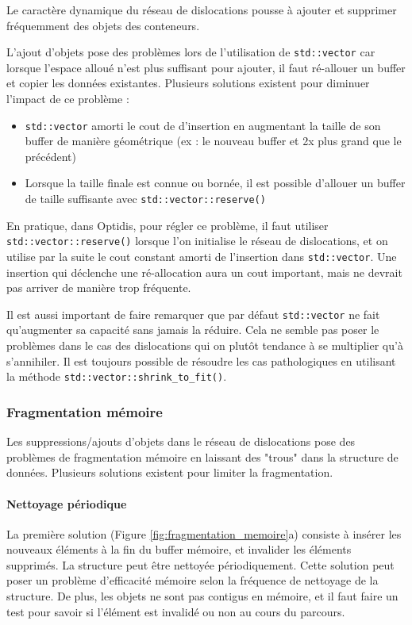 Le caractère dynamique du réseau de dislocations pousse à ajouter et supprimer fréquemment des objets des conteneurs. 

L'ajout d'objets pose des problèmes lors de l'utilisation de \verb|std::vector| car lorsque l'espace alloué n'est plus suffisant pour ajouter, il faut ré-allouer un buffer et copier les données existantes. Plusieurs solutions existent pour diminuer l'impact de ce problème :
\begin{itemize}
	\item \verb|std::vector| amorti le cout de d'insertion en augmentant la taille de son buffer de manière géométrique (ex : le nouveau buffer et 2x plus grand que le précédent)
	\item Lorsque la taille finale est connue ou bornée, il est possible d'allouer un buffer de taille suffisante avec \verb|std::vector::reserve()|
\end{itemize}
En pratique, dans Optidis, pour régler ce problème, il faut utiliser \verb|std::vector::reserve()| lorsque l'on initialise le réseau de dislocations, et on utilise par la suite le cout constant amorti de l'insertion dans \verb|std::vector|. Une insertion qui déclenche une ré-allocation aura un cout important, mais ne devrait pas arriver de manière trop fréquente.

Il est aussi important de faire remarquer que par défaut \verb|std::vector| ne fait qu'augmenter sa capacité sans jamais la réduire. Cela ne semble pas poser le problèmes dans le cas des dislocations qui on plutôt tendance à se multiplier qu'à s'annihiler. Il est toujours possible de résoudre les cas pathologiques en utilisant la méthode \verb|std::vector::shrink_to_fit()|.

\subsubsection{Fragmentation mémoire}
\label{sec:fragmentation_memoire}

Les suppressions/ajouts d'objets dans le réseau de dislocations pose des problèmes de fragmentation mémoire en laissant des "trous" dans la structure de données. Plusieurs solutions existent pour limiter la fragmentation.

\paragraph{Nettoyage périodique}
La première solution (Figure \ref{fig:fragmentation_memoire}a) consiste à insérer les nouveaux éléments à la fin du buffer mémoire, et invalider les éléments supprimés. La structure peut être nettoyée périodiquement. Cette solution peut poser un problème d'efficacité mémoire selon la fréquence de nettoyage de la structure. De plus, les objets ne sont pas contigus en mémoire, et il faut faire un test pour savoir si l'élément est invalidé ou non au cours du parcours.

